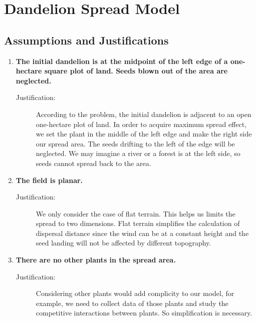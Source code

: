 \documentclass[12pt]{article}
\begin{document}
\section{Dandelion Spread Model}

	\subsection{Assumptions and Justifications}
	
		\begin{enumerate}
			
			\item \textbf{The initial dandelion is at the midpoint of the left edge of a one-hectare square plot of land.  Seeds blown out of the area are neglected.}
			\vspace{-0.125in}
			\begin{description}
				\item[Justification:] According to the problem, the initial dandelion is adjacent to an open one-hectare plot of land. In order to acquire maximum spread effect, we set the plant in the middle of the left edge and make the right side our spread area. The seeds drifting to the left of the edge will be neglected. We may imagine a river or a forest is at the left side, so seeds cannot spread back to the area.
			\end{description}
			
			\item \textbf{The field is planar.}
			\vspace{-0.125in}
			\begin{description}
				\item[Justification:] We only consider the case of flat terrain.  This helps us limits the spread to two dimensions.  Flat terrain simplifies the calculation of dispersal distance since the wind can be at a constant height and the seed landing will not be affected by different topography.
			\end{description}
			
			\item \textbf{There are no other plants in the spread area.}
			\vspace{-0.125in}
			\begin{description}
				\item[Justification:] Considering other plants would add complicity to our model, for example, we need to collect data of those plants and study the competitive interactions between plants.  So simplification is necessary.
				

\end{description}
\end{enumerate}
\end{document}
